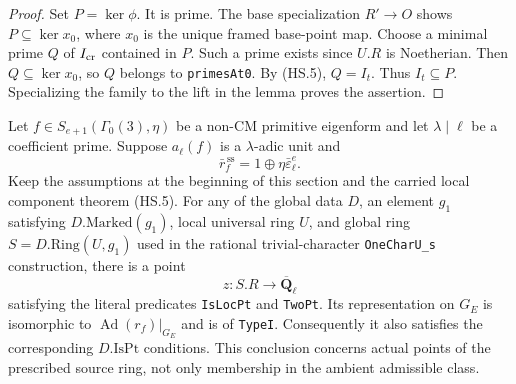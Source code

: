 \begin{proof}
Set $P=\ker\phi$.  It is prime.  The base specialization
$R'\to O$ shows $P\subseteq\ker x_0$, where $x_0$ is the
unique framed base-point map.  Choose a minimal prime $Q$ of
$I_{\rm cr}$ contained in $P$.  Such a prime exists since
$U.R$ is Noetherian.  Then $Q\subseteq\ker x_0$, so $Q$
belongs to \texttt{primesAt0}.  By (HS.5), $Q=I_t$.
Thus $I_t\subseteq P$.  Specializing the family to the lift
in the lemma proves the assertion.
\end{proof}

\begin{theorem}
Let $f\in S_{e+1}(\Gamma_0(3),\eta)$ be a non-CM primitive
eigenform and let $\lambda\mid\ell$ be a coefficient prime.
Suppose $a_\ell(f)$ is a $\lambda$-adic unit and
\[
 \bar r_f^{\,\mathrm{ss}}
       =1\oplus\eta\bar\varepsilon_\ell^e.                 \tag{HS.11}
\]
Keep the assumptions at the beginning of this section and
the carried local component theorem (HS.5).  For any of the
global data $D$, an element $g_1$ satisfying $D.\mathrm{Marked}(g_1)$,
local universal ring
$U$, and global ring $S=D.\mathrm{Ring}(U,g_1)$ used in the
rational trivial-character \texttt{OneCharU\_s} construction,
there is a point
\[
                  z:S.R\longrightarrow\overline{\mathbf Q}_\ell
                                                               \tag{HS.12}
\]
satisfying the literal predicates \texttt{IsLocPt} and
\texttt{TwoPt}.  Its representation on $G_E$ is isomorphic
to $\operatorname{Ad}(r_f)|_{G_E}$ and is of \texttt{TypeI}.
Consequently it also satisfies the corresponding
$D.\mathrm{IsPt}$ conditions.  This conclusion concerns
actual points of the prescribed source ring, not only
membership in the ambient admissible class.
\end{theorem}

